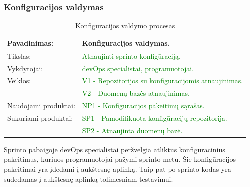 \documentclass{VUMIFPSkursinis}
\begin{document}
	\subsubsection{Konfigūracijos valdymas}
	\begin{center}
		\begin{table}[ht]
			\caption{Konfigūracijos valdymo procesas}
			\begin{tabular}{ | l | l | }
				\hline
				Pavadinimas:		& Konfigūracijos valdymas.				\\ \hline
				Tikslas: 		& \textcolor{green}{Atnaujinti sprinto konfigūraciją.}			\\ \hline
				Vykdytojai:		& \textcolor{green}{devOps specialistai, programuotojai.}			\\ \hline
				Veiklos:		& \textcolor{green}{V1 - Repozitorijos su konfigūracijomis atnaujinimas.}	\\
							&\textcolor{green}{ V2 - Duomenų bazės atnaujinimas.	}		\\ \hline
				Naudojami produktai:	& \textcolor{green}{NP1 - Konfigūracijos pakeitimų sąrašas.	}	\\ \hline
				Sukuriami produktai:	& \textcolor{green}{SP1 - Pamodifikuota konfigūracijų repozitorija. }	\\
							& \textcolor{green}{SP2 - Atnaujinta duomenų bazė. }			\\ \hline
			\end{tabular}
		\end{table}
	\end{center}
		Sprinto pabaigoje devOps specialistai peržvelgia atliktus konfigūracinius pakeitimus, kuriuos programuotojai pažymi sprinto metu.
		Šie konfigūracijos pakeitimai yra įdedami į aukštesnę aplinką. Taip pat po sprinto kodas yra sudedamas į aukštesnę aplinką tolimesniam testavimui.
\end{document}
